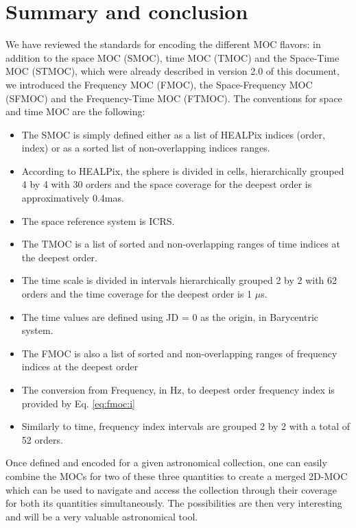 \documentclass[11pt,a4paper]{ivoa}
\begin{document}
\section{Summary and conclusion}
We have reviewed the standards for encoding the different MOC flavors: 
in addition to the space MOC (SMOC), time MOC (TMOC)
and the Space-Time MOC (STMOC), which were already described in version 2.0 of this document,
we introduced the Frequency MOC (FMOC), the Space-Frequency MOC (SFMOC) and the
Frequency-Time MOC (FTMOC). 
The conventions for space and time MOC are the following:
\begin{itemize}
\item The SMOC is simply defined either as a list of HEALPix indices (order, index) 
      or as a sorted list of non-overlapping indices ranges.
\item According to HEALPix, the sphere is divided in cells,
  hierarchically grouped 4 by 4 with 30 orders and the space coverage
  for the deepest order is approximatively 0.4mas.
\item The space reference system is ICRS. 
\item The TMOC is a list of sorted and non-overlapping ranges of time indices at the deepest order.
\item The time scale is divided in intervals hierarchically grouped 2 by
  2 with 62 orders and the time coverage for the deepest order is 1 $\mu$s. 
\item The time values are defined using JD = 0 as the origin, in Barycentric system. 
\item The FMOC is also a list of sorted and non-overlapping ranges of frequency indices at the deepest order
\item The conversion from Frequency, in Hz, to deepest order frequency index is provided by Eq. \ref{eq:fmoc:i}
\item Similarly to time, frequency index intervals are grouped 2 by 2 with a total of 52 orders.
\end{itemize}

Once defined and encoded for a given astronomical collection, one
can easily combine the MOCs for two of these three quantities
to create a merged 2D-MOC which can be used to navigate and access the collection
through their coverage for both its quantities simultaneously.
The possibilities are then very interesting and will be a very
valuable astronomical tool.


\end{document}
